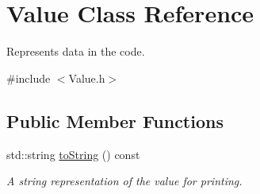 \hypertarget{class_value}{}\section{Value Class Reference}
\label{class_value}


Represents data in the code.  




{\ttfamily \#include $<$Value.\+h$>$}

\subsection*{Public Member Functions}
\begin{DoxyCompactItemize}
\item 
\mbox{\label{class_value_aeaa7240f4916e9905237c74034502b30}} 
std\+::string \hyperlink{class_value_aeaa7240f4916e9905237c74034502b30}{to\+String} () const
\begin{DoxyCompactList}\small\item\em A string representation of the value for printing. \end{DoxyCompactList}\end{DoxyCompactItemize}

